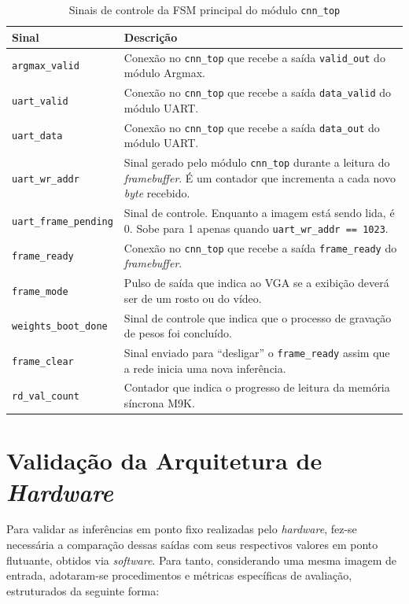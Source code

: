 \begin{table}[H]
\centering
\caption{Sinais de controle da FSM principal do módulo \texttt{cnn\_top}}
\label{tab:sinais_fsm_controle}
\small
\begin{tabularx}{\textwidth}{l X}
\toprule
\textbf{Sinal} & \textbf{Descrição} \\
\midrule
\texttt{argmax\_valid} & Conexão no \texttt{cnn\_top} que recebe a saída \texttt{valid\_out} do módulo Argmax. \\
\texttt{uart\_valid} & Conexão no \texttt{cnn\_top} que recebe a saída \texttt{data\_valid} do módulo UART. \\
\texttt{uart\_data} & Conexão no \texttt{cnn\_top} que recebe a saída \texttt{data\_out} do módulo UART. \\
\texttt{uart\_wr\_addr} & Sinal gerado pelo módulo \texttt{cnn\_top} durante a leitura do \textit{framebuffer}. É um contador que incrementa a cada novo \textit{byte} recebido. \\
\texttt{uart\_frame\_pending} & Sinal de controle. Enquanto a imagem está sendo lida, é 0. Sobe para 1 apenas quando \texttt{uart\_wr\_addr == 1023}. \\
\texttt{frame\_ready} & Conexão no \texttt{cnn\_top} que recebe a saída \texttt{frame\_ready} do \textit{framebuffer}. \\
\texttt{frame\_mode} & Pulso de saída que indica ao VGA se a exibição deverá ser de um rosto ou do vídeo. \\
\texttt{weights\_boot\_done} & Sinal de controle que indica que o processo de gravação de pesos foi concluído. \\
\texttt{frame\_clear} & Sinal enviado para ``desligar'' o \texttt{frame\_ready} assim que a rede inicia uma nova inferência. \\
\texttt{rd\_val\_count} & Contador que indica o progresso de leitura da memória síncrona M9K. \\
\bottomrule
\end{tabularx}
\end{table}

\section{Validação da Arquitetura de \textit{Hardware} }

Para validar as inferências em ponto fixo realizadas pelo \textit{hardware}, fez-se necessária a comparação dessas saídas com seus respectivos valores em ponto flutuante, obtidos via \textit{software}. Para tanto, considerando uma mesma imagem de entrada, adotaram-se procedimentos e métricas específicas de avaliação, estruturados da seguinte forma:

